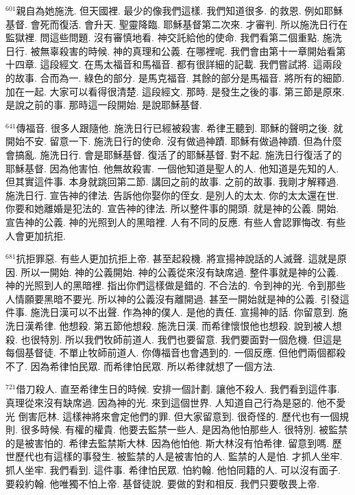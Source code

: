 \documentclass{book}
\begin{document}
$^{601}$親自為她施洗.
但天國裡.
最少的像我們這樣.
我們知道很多.
的救恩.
例如耶穌基督.
會死而復活.
會升天.
聖靈降臨.
耶穌基督第二次來.
才審判.
所以施洗日行在監獄裡.
問這些問題.
沒有審慎地看.
神交託給他的使命.
我們看第二個重點.
施洗日行.
被無辜殺害的時候.
神的真理和公義.
在哪裡呢.
我們會由第十一章開始看第十四章.
這段經文.
在馬太福音和馬福音.
都有很詳細的記載.
我們嘗試將.
這兩段的故事.
合而為一.
綠色的部分.
是馬克福音.
其餘的部分是馬福音.
將所有的細節.
加在一起.
大家可以看得很清楚.
這段經文.
那時.
是發生之後的事.
第三節是原來.
是說之前的事.
那時這一段開始.
是說耶穌基督.

$^{641}$傳福音.
很多人跟隨他.
施洗日行已經被殺害.
希律王聽到.
耶穌的聲明之後.
就開始不安.
留意一下.
施洗日行的使命.
沒有做過神蹟.
耶穌有做過神蹟.
但為什麼會搞亂.
施洗日行.
會是耶穌基督.
復活了的耶穌基督.
對不起.
施洗日行復活了的耶穌基督.
因為他害怕.
他無故殺害.
一個他知道是聖人的人.
他知道是先知的人.
但其實這件事.
本身就跳回第二節.
講回之前的故事.
之前的故事.
我剛才解釋過.
施洗日行.
宣告神的律法.
告訴他你娶你的侄女.
是別人的太太.
你的太太還在世.
你要和她離婚是犯法的.
宣告神的律法.
所以整件事的開頭.
就是神的公義.
開始.
宣告神的公義.
神的光照到人的黑暗裡.
人有不同的反應.
有些人會認罪悔改.
有些人會更加抗拒.

$^{681}$抗拒罪惡.
有些人更加抗拒上帝.
甚至起殺機.
將宣揚神說話的人滅聲.
這就是原因.
所以一開始.
神的公義開始.
神的公義從來沒有缺席過.
整件事就是神的公義.
神的光照到人的黑暗裡.
指出你們這樣做是錯的.
不合法的.
令到神的光.
令到那些人情願要黑暗不要光.
所以神的公義沒有離開過.
甚至一開始就是神的公義.
引發這件事.
施洗日漢可以不出聲.
作為神的僕人.
是他的責任.
宣揚神的話.
你留意到.
施洗日漢希律.
他想殺.
第五節他想殺.
施洗日漢.
而希律懷恨他也想殺.
說到被人想殺.
也很特別.
所以我們牧師前道人.
我們也要留意.
我們要面對一個危機.
但這是每個基督徒.
不單止牧師前道人.
你傳福音也會遇到的.
一個反應.
但他們兩個都殺不了.
因為希律怕民眾.
而希律怕民眾.
所以希律就想了一個方法.

$^{721}$借刀殺人.
直至希律生日的時候.
安排一個計劃.
讓他不殺人.
我們看到這件事.
真理從來沒有缺席過.
因為神的光.
來到這個世界.
人知道自己行為是惡的.
他不愛光 倒害厄林.
這樣神將來會定他們的罪.
但大家留意到.
很奇怪的.
歷代也有一個規則.
很多時候.
有權的權貴.
他要去監禁一些人.
是因為他怕那些人.
很特別.
被監禁的是被害怕的.
希律去監禁斯大林.
因為他怕他.
斯大林沒有怕希律.
留意到嗎.
歷世歷代也有這樣的事發生.
被監禁的人是被害怕的人.
監禁的人是怕.
才抓人坐牢.
抓人坐牢.
我們看到.
這件事.
希律怕民眾.
怕約翰.
他怕同籍的人.
可以沒有面子.
要殺約翰.
他唯獨不怕上帝.
基督徒說.
要做的對和相反.
我們只要敬畏上帝.
\end{document}
